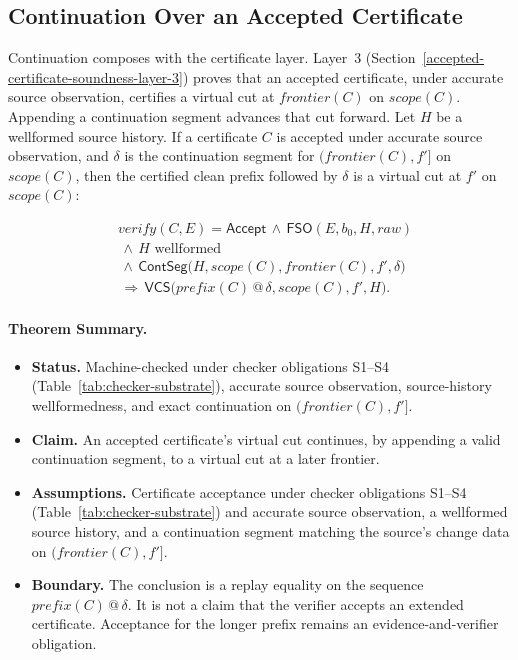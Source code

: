 \documentclass[letterpaper,10pt,twocolumn]{article}
\newcommand{\Scope}{\mathit{scope}}
\newcommand{\Frontier}{\mathit{frontier}}
\newcommand{\CleanPrefix}{\mathit{prefix}}
\newcommand{\Verify}{\mathit{verify}}
\newcommand{\RawObs}{\mathit{raw}}
\newcommand{\FSO}{\mathsf{FSO}}
\newcommand{\VCS}{\mathsf{VCS}}
\newcommand{\ContSeg}{\mathsf{ContSeg}}
\newcommand{\Accept}{\mathsf{Accept}}
\providecommand{\tightlist}{\setlength{\itemsep}{0pt}\setlength{\parskip}{0pt}}
\begin{document}
\subsection{Continuation Over an Accepted
Certificate}\label{continuation-over-an-accepted-certificate}

Continuation composes with the certificate layer. Layer~3
(Section~\ref{accepted-certificate-soundness-layer-3}) proves that an
accepted certificate, under accurate source observation, certifies a
virtual cut at $\Frontier(C)$ on $\Scope(C)$. Appending a continuation
segment advances that cut forward. Let $H$ be a wellformed source
history. If a certificate $C$ is accepted under accurate source
observation, and $\delta$ is the continuation segment for
$(\Frontier(C),f']$ on $\Scope(C)$, then the certified clean prefix
followed by $\delta$ is a virtual cut at $f'$ on $\Scope(C)$:

\[
\begin{aligned}
&\Verify(C,E)=\Accept \,\land\, \FSO(E,b_0,H,\RawObs)\\
&\,\land\, H \text{ wellformed}\\
&\,\land\, \ContSeg\bigl(H,\Scope(C),\Frontier(C),f',\delta\bigr)\\
&\,\Longrightarrow\, \VCS\bigl(\CleanPrefix(C) \mathbin{@} \delta, \Scope(C), f', H\bigr).
\end{aligned}
\]

\paragraph*{Theorem Summary.}
\begin{itemize}
\tightlist
\item
  \textbf{Status.} Machine-checked under
  checker obligations S1--S4
  (Table~\ref{tab:checker-substrate}), accurate source observation,
  source-history wellformedness, and exact continuation on
  $(\Frontier(C),f']$.
\item
  \textbf{Claim.} An accepted certificate's virtual cut continues, by
  appending a valid continuation segment, to a virtual cut at a later
  frontier.
\item
  \textbf{Assumptions.} Certificate acceptance under checker
  obligations S1--S4 (Table~\ref{tab:checker-substrate}) and accurate
  source observation, a wellformed source history, and a
  continuation segment matching the source's change data on
  $(\Frontier(C),f']$.
\item
  \textbf{Boundary.} The conclusion is a replay equality on the
  sequence $\CleanPrefix(C) \mathbin{@} \delta$. It is not a
  claim that the verifier accepts an extended certificate.
  Acceptance for the longer prefix remains an evidence-and-verifier
  obligation.
\end{itemize}
\end{document}
